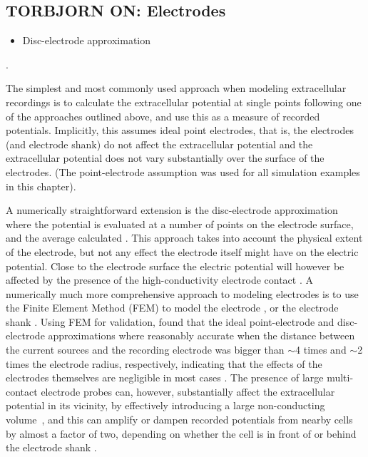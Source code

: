 \subsection{\red TORBJORN ON: Electrodes}
\label{sec:electrode}
\begin{itemize}
\item Disc-electrode approximation
\end{itemize}
. 

The simplest and most commonly used approach when modeling extracellular recordings is to calculate the extracellular potential at single points following one of the approaches outlined above, and use this as a measure of recorded potentials. Implicitly, this assumes ideal point electrodes, that is, the electrodes (and electrode shank) do not affect the extracellular potential and the extracellular potential does not vary substantially over the surface of the electrodes. (The point-electrode assumption was used for all simulation examples in this chapter).

A numerically straightforward extension is the disc-electrode approximation where the potential is evaluated at a number of points on the electrode surface, and the average calculated \citep{ Linden2014}. This approach takes into account the physical extent of the electrode, but not any effect the electrode itself might have on the electric potential. Close to the electrode surface the electric potential will however be affected by the presence of the high-conductivity electrode contact \citep{McIntyre2001, Moulin2008}. A numerically much more comprehensive approach to modeling electrodes is to use the Finite Element Method (FEM) to model the electrode \citep{Moulin2008, Ness2015}, or the electrode shank \citep{Moffitt2005, Buccino2019b}. Using FEM for validation, \cite{Ness2015} found that the ideal point-electrode and disc-electrode approximations where reasonably accurate when the distance between the current sources and the recording electrode was bigger than $\sim$4 times and $\sim$2 times the electrode radius, respectively, indicating that the effects of the electrodes themselves are negligible in most cases \citep{Nelson2010}.
The presence of large multi-contact electrode probes can, however, substantially affect the extracellular potential in its vicinity, by effectively introducing a large non-conducting volume~\citep{Mechler2012}, and this can amplify or dampen recorded potentials from nearby cells by almost a factor of two, depending on whether the cell is in front of or behind the electrode shank \citep{Buccino2019b}.

